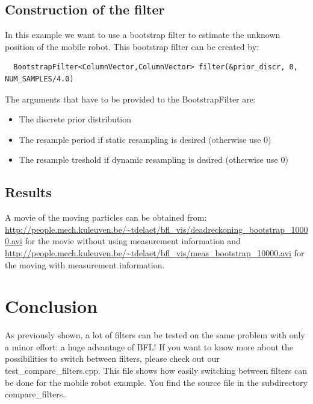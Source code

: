 \documentclass[a4paper,10pt]{report}
\begin{document}
\subsection{Construction of the filter}
In this example we want to use a bootstrap filter to estimate the
unknown position of the mobile robot. This bootstrap filter can be
created by:
\begin{verbatim}
  BootstrapFilter<ColumnVector,ColumnVector> filter(&prior_discr, 0, NUM_SAMPLES/4.0)
\end{verbatim}
The arguments that have to be provided to the BootstrapFilter are:
\begin{itemize}
\item The discrete prior distribution
\item The resample period if static resampling is desired (otherwise
  use 0)
\item The resample treshold if dynamic resampling is desired
  (otherwise use 0)
\end{itemize}



\subsection{Results}
A movie of the moving particles can be obtained from:
\url{http://people.mech.kuleuven.be/~tdelaet/bfl_vis/deadreckoning_bootstrap_10000.avi}
for the movie without using measurement information and
\url{http://people.mech.kuleuven.be/~tdelaet/bfl_vis/meas_bootstrap_10000.avi}
for the moving with measurement information.











\pagebreak
\section{Conclusion}
As previously shown, a lot of filters can be tested on the same
problem with only a minor effort: a huge advantage of BFL!  If you
want to know more about the possibilities to switch between filters,
please check out our test\_compare\_filters.cpp. This file shows how
easily switching between filters can be done for the mobile robot
example.  You find the source file in the subdirectory
compare\_filters.
\end{document}
